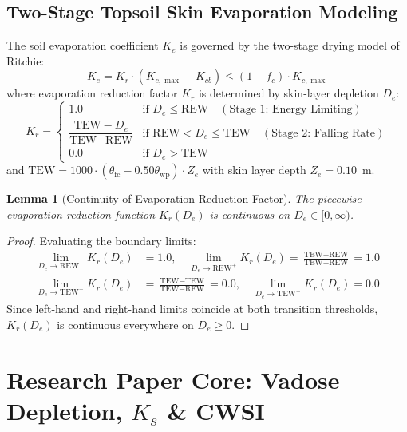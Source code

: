 \documentclass[11pt,a4paper]{article}
\newtheorem{lemma}[theorem]{Lemma}
\theoremstyle{definition}
\theoremstyle{remark}
\begin{document}
\subsection{Two-Stage Topsoil Skin Evaporation Modeling}
The soil evaporation coefficient $K_e$ is governed by the two-stage drying model of Ritchie:
\begin{equation}
    K_e = K_r \cdot (K_{c,\max} - K_{cb}) \le (1 - f_c) \cdot K_{c,\max}
\end{equation}
where evaporation reduction factor $K_r$ is determined by skin-layer depletion $D_e$:
\begin{equation}
    K_r = \begin{cases} 
    1.0 & \text{if } D_e \le \text{REW} \quad (\text{Stage 1: Energy Limiting}) \\ 
    \dfrac{\text{TEW} - D_e}{\text{TEW} - \text{REW}} & \text{if } \text{REW} < D_e \le \text{TEW} \quad (\text{Stage 2: Falling Rate}) \\ 
    0.0 & \text{if } D_e > \text{TEW} 
    \end{cases}
\end{equation}
and $\text{TEW} = 1000 \cdot (\theta_{\text{fc}} - 0.50 \theta_{\text{wp}}) \cdot Z_e$ with skin layer depth $Z_e = 0.10$~m.

\begin{lemma}[Continuity of Evaporation Reduction Factor]
The piecewise evaporation reduction function $K_r(D_e)$ is continuous on $D_e \in [0, \infty)$.
\end{lemma}
\begin{proof}
Evaluating the boundary limits:
\begin{align}
    \lim_{D_e \to \text{REW}^-} K_r(D_e) &= 1.0, \quad \lim_{D_e \to \text{REW}^+} K_r(D_e) = \frac{\text{TEW} - \text{REW}}{\text{TEW} - \text{REW}} = 1.0 \\
    \lim_{D_e \to \text{TEW}^-} K_r(D_e) &= \frac{\text{TEW} - \text{TEW}}{\text{TEW} - \text{REW}} = 0.0, \quad \lim_{D_e \to \text{TEW}^+} K_r(D_e) = 0.0
\end{align}
Since left-hand and right-hand limits coincide at both transition thresholds, $K_r(D_e)$ is continuous everywhere on $D_e \ge 0$.
\end{proof}


\section{Research Paper Core: Vadose Depletion, $K_s$ \& CWSI}
\end{document}
